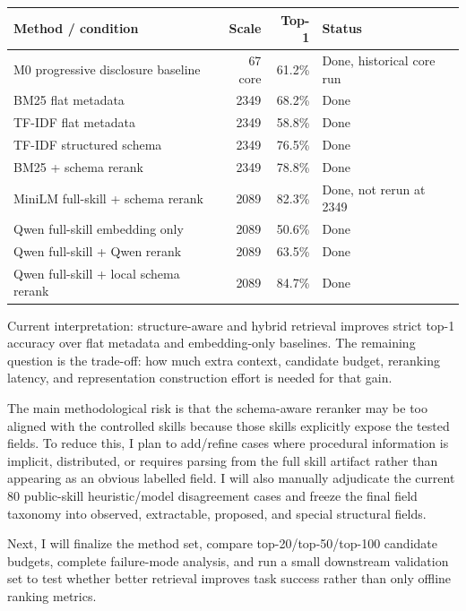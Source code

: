 \documentclass[10pt,a4paper]{article}
\newcommand{\sectiontitle}[1]{\vspace{0.22em}{\normalsize\bfseries\color{headingblue} #1}\par\vspace{-0.35em}}
\begin{document}
\begin{center}
\scriptsize
\begin{tabular}{@{}lrrl@{}}
\toprule
\textbf{Method / condition} & \textbf{Scale} & \textbf{Top-1} & \textbf{Status} \\
\midrule
M0 progressive disclosure baseline & 67 core & 61.2\% & Done, historical core run \\
BM25 flat metadata & 2349 & 68.2\% & Done \\
TF-IDF flat metadata & 2349 & 58.8\% & Done \\
TF-IDF structured schema & 2349 & 76.5\% & Done \\
BM25 + schema rerank & 2349 & 78.8\% & Done \\
MiniLM full-skill + schema rerank & 2089 & 82.3\% & Done, not rerun at 2349 \\
Qwen full-skill embedding only & 2089 & 50.6\% & Done \\
Qwen full-skill + Qwen rerank & 2089 & 63.5\% & Done \\
Qwen full-skill + local schema rerank & 2089 & 84.7\% & Done \\
\bottomrule
\end{tabular}
\end{center}

Current interpretation: structure-aware and hybrid retrieval improves strict top-1 accuracy over flat metadata and embedding-only baselines. The remaining question is the trade-off: how much extra context, candidate budget, reranking latency, and representation construction effort is needed for that gain.

\sectiontitle{Current Risks and Next Steps}

The main methodological risk is that the schema-aware reranker may be too aligned with the controlled skills because those skills explicitly expose the tested fields. To reduce this, I plan to add/refine cases where procedural information is implicit, distributed, or requires parsing from the full skill artifact rather than appearing as an obvious labelled field. I will also manually adjudicate the current 80 public-skill heuristic/model disagreement cases and freeze the final field taxonomy into observed, extractable, proposed, and special structural fields.

Next, I will finalize the method set, compare top-20/top-50/top-100 candidate budgets, complete failure-mode analysis, and run a small downstream validation set to test whether better retrieval improves task success rather than only offline ranking metrics.
\end{document}

